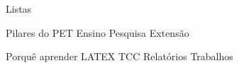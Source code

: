 Listas

 Pilares do PET
	 Ensino
     Pesquisa
     Extensão

 Porquê aprender LATEX
	 TCC
     Relatórios
     Trabalhos